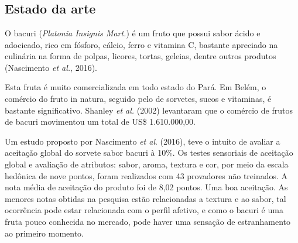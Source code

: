 \documentclass[10pt,a4paper]{article}
\begin{document}
\setmainfont{[spranq_eco_sans_regular.ttf]}

 

\tableofcontents

\newpage
\listoffigures
\newpage
\listoftables



\newpage

\section{}

\subsection{{ Estado da arte}}

\par O bacuri (\textit{Platonia Insignis Mart.}) é um fruto que possui sabor ácido e adocicado, rico em fósforo, cálcio, ferro e vitamina C, bastante apreciado na culinária na forma de polpas, licores, tortas, geleias, dentre outros produtos (Nascimento \textit{et al.}, 2016). \par
Esta fruta é muito comercializada em todo estado do Pará. Em Belém, o comércio do fruto in natura, seguido pelo de sorvetes, sucos e vitaminas, é bastante significativo. Shanley \textit{et al.} (2002) levantaram que o comércio de frutos de bacuri movimentou um total de US\$ 1.610.000,00.

Um estudo proposto por Nascimento \textit{et al}. (2016), teve o intuito de avaliar a aceitação global do sorvete sabor bacuri à 10\%. Os testes sensoriais de aceitação global e avaliação de atributos: sabor, aroma, textura e cor, por meio da escala hedônica de nove pontos, foram realizados com 43 provadores não treinados. A nota média de aceitação do produto foi de 8,02 pontos. Uma boa aceitação. As menores notas obtidas na pesquisa estão relacionadas a textura e ao sabor, tal ocorrência pode estar relacionada com o perfil afetivo, e como o bacuri é uma fruta pouco conhecida no mercado, pode haver uma sensação de estranhamento ao primeiro momento.
\end{document}
